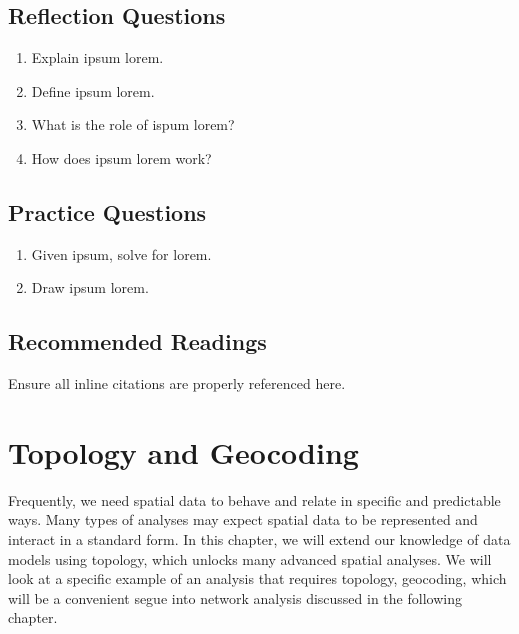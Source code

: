 \documentclass[
]{book}
\providecommand{\tightlist}{%
  \setlength{\itemsep}{0pt}\setlength{\parskip}{0pt}}
\begin{document}
\hypertarget{reflection-questions-4}{%
\section*{Reflection Questions}\label{reflection-questions-4}}

\begin{enumerate}
\def\labelenumi{\arabic{enumi}.}
\tightlist
\item
  Explain ipsum lorem.
\item
  Define ipsum lorem.
\item
  What is the role of ispum lorem?
\item
  How does ipsum lorem work?
\end{enumerate}

\hypertarget{practice-questions-4}{%
\section*{Practice Questions}\label{practice-questions-4}}

\begin{enumerate}
\def\labelenumi{\arabic{enumi}.}
\setcounter{enumi}{1}
\tightlist
\item
  Given ipsum, solve for lorem.
\item
  Draw ipsum lorem.
\end{enumerate}

\hypertarget{recommended-readings-1}{%
\section*{Recommended Readings}\label{recommended-readings-1}}

Ensure all inline citations are properly referenced here.

\hypertarget{topology-and-geocoding}{%
\chapter{Topology and Geocoding}\label{topology-and-geocoding}}

Frequently, we need spatial data to behave and relate in specific and predictable ways. Many types of analyses may expect spatial data to be represented and interact in a standard form. In this chapter, we will extend our knowledge of data models using topology, which unlocks many advanced spatial analyses. We will look at a specific example of an analysis that requires topology, geocoding, which will be a convenient segue into network analysis discussed in the following chapter.
\end{document}
